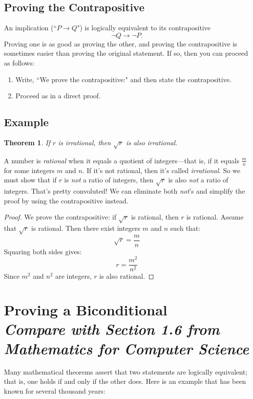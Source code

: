\documentclass[11pt,oneside]{book}
\newtheorem{thm}{Theorem}[section]
\theoremstyle{definition}
\begin{document}
\subsection{Proving the Contrapositive}
An implication (``$P \rightarrow Q$") is logically equivalent to its contrapositive
\[ \lnot Q \rightarrow \lnot P. \]
Proving one is as good as proving the other, and proving the contrapositive is sometimes easier than proving the original statement.
If so, then you can proceed as follows:
\begin{enumerate}
    \item Write, ``We prove the contrapositive:" and then state the contrapositive.

    \item Proceed as in a direct proof.
\end{enumerate}

\subsection*{Example}
\begin{thm}
    If $r$ is irrational, then $\sqrt{r}$ is also irrational.
\end{thm}

A number is \emph{rational} when it equals a quotient of integers—that is, if it equals $\frac{m}{n}$ for some integers $m$ and $n$.
If it's not rational, then it's called \emph{irrational}.
So we must show that if $r$ is \emph{not} a ratio of integers, then $\sqrt{r}$ is also \emph{not} a ratio of integers.
That's pretty convoluted!
We can eliminate both \emph{not}'s and simplify the proof by using the contrapositive instead.
\begin{proof}
    We prove the contrapositive: if $\sqrt{r}$ is rational, then $r$ is rational.
    Assume that $\sqrt{r}$ is rational.
    Then there exist integers $m$ and $n$ such that:
    \[ \sqrt{r} = \frac{m}{n} \]
    Squaring both sides gives:
    \[ r = \frac{m^{2}}{n^{2}} \]
    Since $m^{2}$ and $n^{2}$ are integers, $r$ is also rational.
\end{proof}


\section[Proving a Biconditional]{Proving a Biconditional\\[0.5ex]
\normalsize\normalfont\textit{
    Compare with Section 1.6 from \emph{Mathematics for Computer Science}
}}\label{subsec:BiconditionalProof}
Many mathematical theorems assert that two statements are logically equivalent; that is, one holds if and only if the other does.
Here is an example that has been known for several thousand years:
\end{document}
